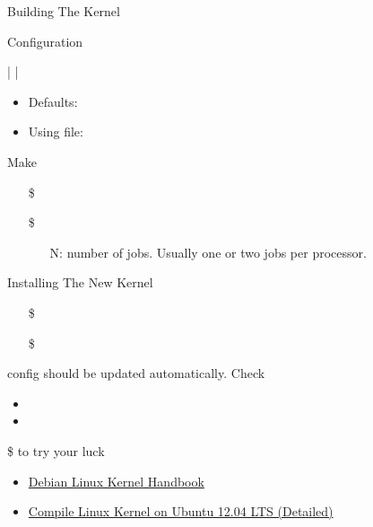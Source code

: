 \begin{frame}{Building The Kernel}
  \begin{block}{Configuration}
    \begin{center}
       |  | 
    \end{center}
    \begin{itemize}
    \item Defaults: 
    \item Using  file: 
    \end{itemize}
  \end{block}
  \begin{block}{Make}
    \begin{itemize}
    \item[\$] 
    \item[\$] 
      \begin{itemize}
      \item[N:] number of jobs. Usually one or two jobs per processor.
      \end{itemize}
    \end{itemize}
  \end{block}
\end{frame}

\begin{frame}
  \begin{block}{Installing The New Kernel}
    \begin{itemize}
    \item[\$] 
    \item[\$] 
    \end{itemize}
     config should be updated automatically. Check
    \begin{itemize}
    \item {}
    \item {}
    \end{itemize}
  \end{block}
  \begin{center}
    \$  to try your luck
  \end{center}
\end{frame}

\begin{itemize}
\item \href{http://kernel-handbook.alioth.debian.org/index.html#contents}{Debian Linux
    Kernel Handbook}
\item
  \href{http://mitchtech.net/compile-linux-kernel-on-ubuntu-12-04-lts-detailed/}{Compile
    Linux Kernel on Ubuntu 12.04 LTS (Detailed)}
\end{itemize}

